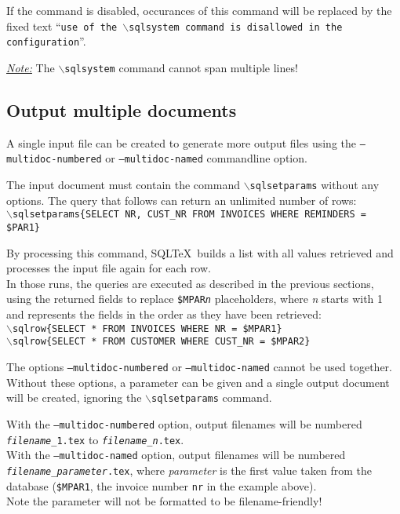 \documentclass{article}
\newcommand{\bs}{\ensuremath{\backslash}}
\newcommand{\vs}{\vspace{3mm}}
\begin{document}
If the command is disabled, occurances of this command will be replaced by the fixed text ``\texttt{use of the \bs sqlsystem command is disallowed in the configuration}''.

\vs

\noindent\hspace{-3mm}\textit{\underline{Note:}} The \texttt{\bs sqlsystem} command cannot span multiple lines!


\subsection{Output multiple documents}\label{multidoc}

A single input file can be created to generate more output files using the \texttt{--multidoc-numbered} or \texttt{--multidoc-named} commandline option.

The input document must contain the command \texttt{\bs sqlsetparams} without any options. The query that follows can return an unlimited number of rows: \\
\texttt{\bs sqlsetparams\{SELECT NR, CUST\_NR FROM INVOICES WHERE REMINDERS = \$PAR1\}}

\vs

By processing this command, SQL\TeX\ builds a list with all values retrieved and
processes the input file again for each row.\\
In those runs, the queries are executed as described in the previous sections,
using the returned fields to replace \texttt{\$MPAR\textit{n}} placeholders, where \textit{n} starts with 1 and represents the fields in the order as they have been retrieved:\\
\texttt{\bs sqlrow\{SELECT * FROM INVOICES WHERE NR = \$MPAR1\}} \\
\texttt{\bs sqlrow\{SELECT * FROM CUSTOMER WHERE CUST\_NR = \$MPAR2\}}

\vs

The options \texttt{--multidoc-numbered} or \texttt{--multidoc-named} cannot be used together.\\
Without these options, a parameter can be given and a single output
document will be created, ignoring the \texttt{\bs sqlsetparams} command.

\vs

With the \texttt{--multidoc-numbered} option, output filenames will be numbered \texttt{\emph{filename}\_1.tex} to \texttt{\emph{filename}\_\emph{n}.tex}.\\
With the \texttt{--multidoc-named} option, output filenames will be numbered \\\texttt{\emph{filename}\_\emph{parameter}.tex}, where \emph{parameter} is the first value taken from the database (\texttt{\$MPAR1}, the invoice number \texttt{nr} in the example above). \\
Note the parameter will not be formatted to be filename-friendly!\\
\end{document}
